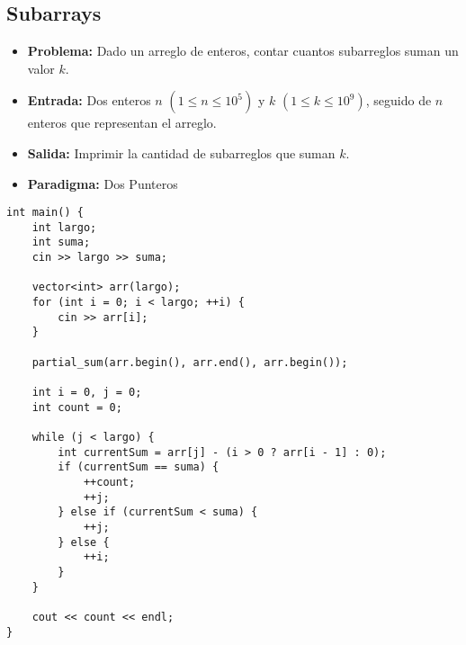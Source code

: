 \subsection{Subarrays}
\begin{itemize}
  \item \textbf{Problema: }Dado un arreglo de enteros, contar cuantos subarreglos suman un valor $k$. 
  \item \textbf{Entrada: }Dos enteros $n$ $(1 \leq n \leq 10^5)$ y $k$ $(1 \leq k \leq 10^9)$, seguido de $n$ enteros que representan el arreglo. 
  \item \textbf{Salida: }Imprimir la cantidad de subarreglos que suman $k$. 

  \item \textbf{Paradigma: } Dos Punteros
\end{itemize}
\begin{lstlisting}[style=cpp]
int main() {
    int largo;
    int suma;
    cin >> largo >> suma;

    vector<int> arr(largo);
    for (int i = 0; i < largo; ++i) {
        cin >> arr[i];
    }
    
    partial_sum(arr.begin(), arr.end(), arr.begin());

    int i = 0, j = 0;
    int count = 0;

    while (j < largo) {
        int currentSum = arr[j] - (i > 0 ? arr[i - 1] : 0);
        if (currentSum == suma) {
            ++count;
            ++j;
        } else if (currentSum < suma) {
            ++j;
        } else {
            ++i;
        }
    }

    cout << count << endl;
}
\end{lstlisting}
